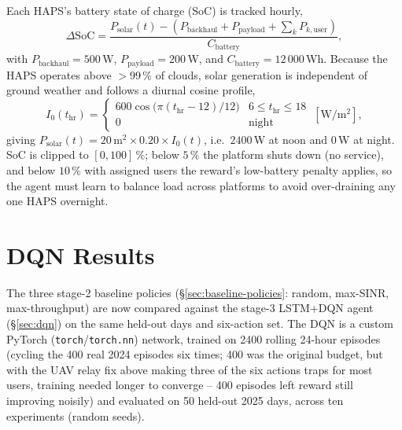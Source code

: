 \documentclass[]{ieeeaccess}
\begin{document}
Each HAPS's battery state of charge (SoC) is tracked hourly,
\begin{equation}
\Delta\mathrm{SoC} = \frac{P_\mathrm{solar}(t) - (P_\mathrm{backhaul}+P_\mathrm{payload}+\sum_k P_{k,\mathrm{user}})}{C_\mathrm{battery}},
\label{eq:battery-balance}
\end{equation}
with $P_\mathrm{backhaul}=500$\,W, $P_\mathrm{payload}=200$\,W, and $C_\mathrm{battery}=12\,000$\,Wh. Because the HAPS operates above $>$99\,\% of clouds, solar generation is independent of ground weather and follows a diurnal cosine profile,
\begin{equation}
I_0(t_\mathrm{hr}) = \begin{cases} 600\cos\!\big(\pi(t_\mathrm{hr}-12)/12\big) & 6\le t_\mathrm{hr}\le 18\\ 0 & \text{night}\end{cases}\ [\mathrm{W/m^2}],
\end{equation}
giving $P_\mathrm{solar}(t)=20\,\mathrm{m}^2\times0.20\times I_0(t)$, i.e.\ $2400$\,W at noon and $0$\,W at night. SoC is clipped to $[0,100]\,\%$; below $5\,\%$ the platform shuts down (no service), and below $10\,\%$ with assigned users the reward's low-battery penalty applies, so the agent must learn to balance load across platforms to avoid over-draining any one HAPS overnight.

\section{DQN Results}
\label{sec:dqn-results}

The three stage-2 baseline policies (\S\ref{sec:baseline-policies}: random, max-SINR, max-throughput) are now compared against the stage-3 LSTM+DQN agent (\S\ref{sec:dqn}) on the same held-out days and six-action set. The DQN is a custom PyTorch (\texttt{torch}/\texttt{torch.nn}) network, trained on 2400 rolling 24-hour episodes (cycling the 400 real 2024 episodes six times; 400 was the original budget, but with the UAV relay fix above making three of the six actions traps for most users, training needed longer to converge -- 400 episodes left reward still improving noisily) and evaluated on 50 held-out 2025 days, across ten experiments (random seeds).
\end{document}
